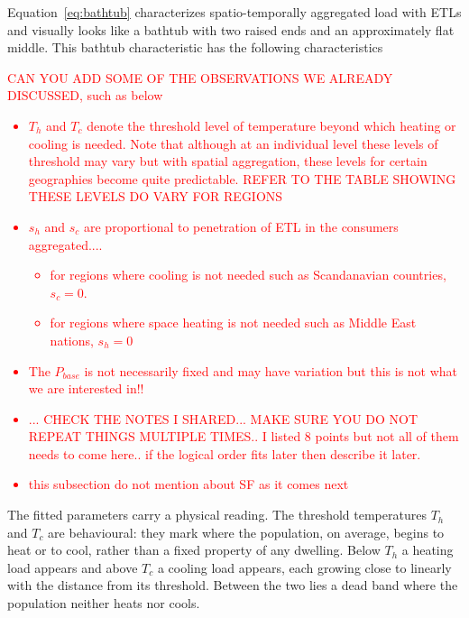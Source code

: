 \documentclass[9pt,journal,a4]{IEEEtran}
\begin{document}
Equation~\eqref{eq:bathtub} characterizes spatio-temporally aggregated load with ETLs and visually looks like a bathtub with two raised ends and an approximately flat middle.
This bathtub characteristic has the following characteristics
\textcolor{red}{CAN YOU ADD SOME OF THE OBSERVATIONS WE ALREADY DISCUSSED, such as below
\begin{itemize}
    \item $T_h$ and $T_c$ denote the threshold level of temperature beyond which heating or cooling is needed. Note that although at an individual level these levels of threshold may vary but with spatial aggregation, these levels for certain geographies become quite predictable. REFER TO THE TABLE SHOWING THESE LEVELS DO VARY FOR REGIONS
    \item $s_h$ and $s_c$ are proportional to penetration of ETL in the consumers aggregated....
    \begin{itemize}
        \item for regions where cooling is not needed such as Scandanavian countries, $s_c=0$.
        \item for regions where space heating is not needed such as Middle East nations, $s_h=0$
    \end{itemize}
    \item The $P_{base}$ is not necessarily fixed and may have variation but this is not what we are interested in!!
    \item ... CHECK THE NOTES I SHARED... MAKE SURE YOU DO NOT REPEAT THINGS MULTIPLE TIMES.. I listed 8 points but not all of them needs to come here.. if the logical order fits later then describe it later.
    \item this subsection do not mention about SF as it comes next
\end{itemize}
}





The fitted parameters carry a physical reading. The threshold temperatures $T_h$ and $T_c$ are behavioural: they mark where the population, on average, begins to heat or to cool, rather than a fixed property of any dwelling. Below $T_h$ a heating load appears and above $T_c$ a cooling load appears, each growing close to linearly with the distance from its threshold. Between the two lies a dead band where the population neither heats nor cools.
\end{document}
